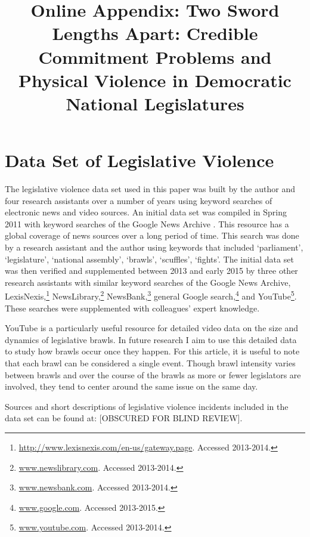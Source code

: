 \documentclass[a4paper]{article}\usepackage[]{graphicx}\usepackage[]{color}
\title{Online Appendix: Two Sword Lengths Apart: Credible Commitment Problems and Physical Violence in Democratic National Legislatures}
\begin{document}
\maketitle



\section*{Data Set of Legislative Violence}


The legislative violence data set used in this paper was built by the author and four research assistants over a number of years using keyword searches of electronic news and video sources. An initial data set was compiled in Spring 2011 with keyword searches of the Google News Archive \citep{GoogleNews2011}. This resource has a global coverage of news sources over a long period of time. This search was done by a research assistant and the author using keywords that included `parliament', `legislature', `national assembly', `brawls', `scuffles', `fights'. The initial data set was then verified and supplemented between 2013 and early 2015 by three other research assistants with similar keyword searches of the Google News Archive, LexisNexis,\footnote{\url{http://www.lexisnexis.com/en-us/gateway.page}. Accessed 2013-2014.} NewsLibrary,\footnote{\url{www.newslibrary.com}. Accessed 2013-2014.} NewsBank,\footnote{\url{www.newsbank.com}. Accessed 2013-2014.} general Google search,\footnote{\url{www.google.com}. Accessed 2013-2015.} and YouTube\footnote{\url{www.youtube.com}. Accessed 2013-2014.}. These searches were supplemented with colleagues' expert knowledge.

YouTube is a particularly useful resource for detailed video data on the size and dynamics of legislative brawls. In future research I aim to use this detailed data to study how brawls occur once they happen. For this article, it is useful to note that each brawl can be considered a single event. Though brawl intensity varies between brawls and over the course of the brawls as more or fewer legislators are involved, they tend to center around the same issue on the same day.

Sources and short descriptions of legislative violence incidents included in the data set can be found at:
[OBSCURED FOR BLIND REVIEW].
\end{document}

